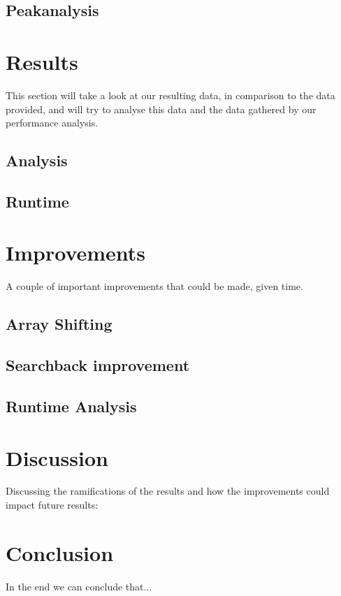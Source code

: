 \documentclass[12pt, danish, a4paper, titlepage]{article}
\begin{document}
		\subsection{Peakanalysis}
			
		
	\section{Results}
	This section will take a look at our resulting data, in comparison to the data provided, and will try to analyse this data and the data gathered by our performance analysis. 
		\subsection{Analysis}
		\subsection{Runtime}
		
	\section{Improvements}
	A couple of important improvements that could be made, given time.
		\subsection{Array Shifting}
		\subsection{Searchback improvement}
		\subsection{Runtime Analysis}
		
	\section{Discussion}
	Discussing the ramifications of the results and how the improvements could impact future results: 
	
	\section{Conclusion}
	In the end we can conclude that...
		
	
\end{document}
